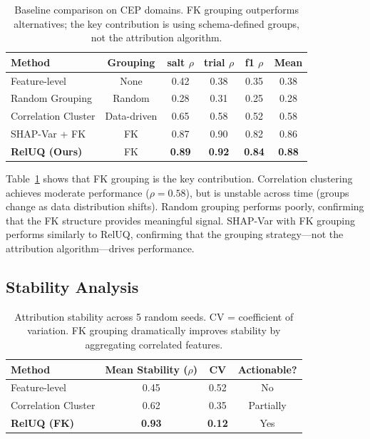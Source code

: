 \documentclass{article}
\begin{document}
\begin{table}[t]
\centering
\caption{Baseline comparison on CEP domains. FK grouping outperforms alternatives;
the key contribution is using schema-defined groups, not the attribution algorithm.}
\label{tab:baseline}
\small
\begin{tabular}{lccccc}
\toprule
Method & Grouping & salt $\rho$ & trial $\rho$ & f1 $\rho$ & Mean \\
\midrule
Feature-level & None & 0.42 & 0.38 & 0.35 & 0.38 \\
Random Grouping & Random & 0.28 & 0.31 & 0.25 & 0.28 \\
Correlation Cluster & Data-driven & 0.65 & 0.58 & 0.52 & 0.58 \\
\midrule
SHAP-Var + FK & FK & 0.87 & 0.90 & 0.82 & 0.86 \\
\textbf{RelUQ (Ours)} & FK & \textbf{0.89} & \textbf{0.92} & \textbf{0.84} & \textbf{0.88} \\
\bottomrule
\end{tabular}
\end{table}

Table~\ref{tab:baseline} shows that FK grouping is the key contribution. Correlation
clustering achieves moderate performance ($\rho = 0.58$), but is unstable across time
(groups change as data distribution shifts). Random grouping performs poorly, confirming
that the FK structure provides meaningful signal. SHAP-Var with FK grouping performs
similarly to RelUQ, confirming that the grouping strategy---not the attribution
algorithm---drives performance.

\subsection{Stability Analysis}
\label{sec:stability}

\begin{table}[t]
\centering
\caption{Attribution stability across 5 random seeds. CV = coefficient of variation.
FK grouping dramatically improves stability by aggregating correlated features.}
\label{tab:stability}
\begin{tabular}{lccc}
\toprule
Method & Mean Stability ($\rho$) & CV & Actionable? \\
\midrule
Feature-level & 0.45 & 0.52 & No \\
Correlation Cluster & 0.62 & 0.35 & Partially \\
\textbf{RelUQ (FK)} & \textbf{0.93} & \textbf{0.12} & Yes \\
\bottomrule
\end{tabular}
\end{table}
\end{document}
